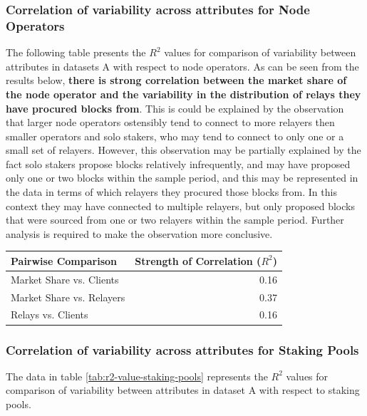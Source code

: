 \documentclass[conference]{IEEEtran}
\begin{document}
\subsubsection{Correlation of variability across attributes for Node Operators}

The following table presents the $R^2$ values for comparison of variability between attributes in datasets A with respect to node operators. As can be seen from the results below, \textbf{there is strong correlation between the market share of the node operator and the variability in the distribution of relays they have procured blocks from}. This is could be explained by the observation that larger node operators ostensibly tend to connect to more relayers then smaller operators and solo stakers, who may tend to connect to only one or a small set of relayers.  However, this observation may be partially explained by the fact solo stakers propose blocks relatively infrequently, and may have proposed only one or two blocks within the sample period, and this may be represented in the data in terms of which relayers they procured those blocks from.  In this context they may have connected to multiple relayers, but only proposed blocks that were sourced from one or two relayers within the sample period. Further analysis is required to make the observation more conclusive.

\begin{table}[htbp]
    \centering
    \normalsize
    \begin{tabular}{p{3.9cm}r}
        \toprule
        Pairwise Comparison & Strength of Correlation ($R^2$) \\
        \midrule
        Market Share vs. Clients & 0.16 \\
        Market Share vs. Relayers & 0.37 \\
        Relays vs. Clients & 0.16 \\
        \bottomrule
    \end{tabular}
\end{table}

\subsubsection{Correlation of variability across attributes for Staking Pools}

The data in table \ref{tab:r2-value-staking-pools} represents the $R^2$ values for comparison of variability between attributes in dataset A with respect to staking pools.
\end{document}
